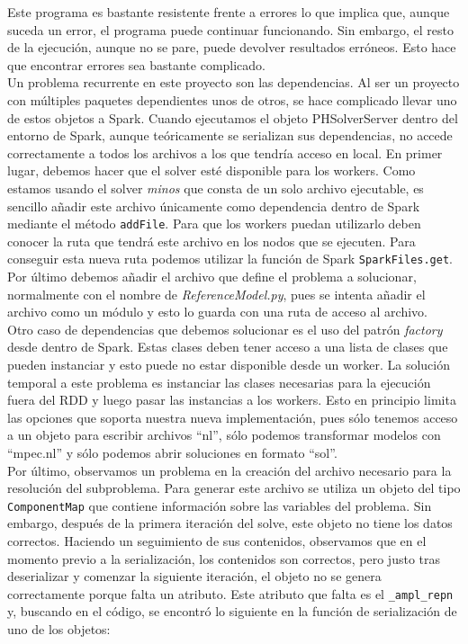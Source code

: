 Este programa es bastante resistente frente a errores lo que implica que, aunque suceda un error, el programa puede continuar funcionando. Sin embargo, el resto de la ejecución, aunque no se pare, puede devolver resultados erróneos. Esto hace que encontrar errores sea bastante complicado.\\

Un problema recurrente en este proyecto son las dependencias. Al ser un proyecto con múltiples paquetes dependientes unos de otros, se hace complicado llevar uno de estos objetos a Spark. Cuando ejecutamos el objeto PHSolverServer dentro del entorno de Spark, aunque teóricamente se serializan sus dependencias, no accede correctamente a todos los archivos a los que tendría acceso en local.
En primer lugar, debemos hacer que el solver esté disponible para los workers. Como estamos usando el solver \textit{minos} que consta de un solo archivo ejecutable, es sencillo añadir este archivo únicamente como dependencia dentro de Spark mediante el método \texttt{addFile}. Para que los workers puedan utilizarlo deben conocer la ruta que tendrá este archivo en los nodos que se ejecuten. Para conseguir esta nueva ruta podemos utilizar la función de Spark \texttt{SparkFiles.get}. Por último debemos añadir el archivo que define el problema a solucionar, normalmente con el nombre de \textit{ReferenceModel.py}, pues se intenta añadir el archivo como un módulo y esto lo guarda con una ruta de acceso al archivo.\\

Otro caso de dependencias que debemos solucionar es el uso del patrón \textit{factory} desde dentro de Spark. Estas clases deben tener acceso a una lista de clases que pueden instanciar y esto puede no estar disponible desde un worker. La solución temporal a este problema es instanciar las clases necesarias para la ejecución fuera del RDD y luego pasar las instancias a los workers. Esto en principio limita las opciones que soporta nuestra nueva implementación, pues sólo tenemos acceso a un objeto para escribir archivos ``nl'', sólo podemos transformar modelos con ``mpec.nl'' y sólo podemos abrir soluciones en formato ``sol''. \\

Por último, observamos un problema en la creación del archivo necesario para la resolución del subproblema. Para generar este archivo se utiliza un objeto del tipo \texttt{ComponentMap} que contiene información sobre las variables del problema. Sin embargo, después de la primera iteración del solve, este objeto no tiene los datos correctos. Haciendo un seguimiento de sus contenidos, observamos que en el momento previo a la serialización, los contenidos son correctos, pero justo tras deserializar y comenzar la siguiente iteración, el objeto no se genera correctamente porque falta un atributo. Este atributo que falta es el \texttt{\_ampl\_repn} y, buscando en el código, se encontró lo siguiente en la función de serialización de uno de los objetos:

